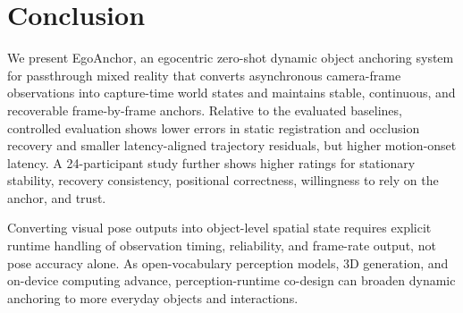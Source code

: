 \documentclass[review]{vgtc}
\begin{document}
\section{Conclusion}\label{sec:conclusion}

We present EgoAnchor, an egocentric zero-shot dynamic object anchoring system for passthrough mixed reality that converts asynchronous camera-frame observations into capture-time world states and maintains stable, continuous, and recoverable frame-by-frame anchors. Relative to the evaluated baselines, controlled evaluation shows lower errors in static registration and occlusion recovery and smaller latency-aligned trajectory residuals, but higher motion-onset latency. A 24-participant study further shows higher ratings for stationary stability, recovery consistency, positional correctness, willingness to rely on the anchor, and trust.

Converting visual pose outputs into object-level spatial state requires explicit runtime handling of observation timing, reliability, and frame-rate output, not pose accuracy alone. As open-vocabulary perception models, 3D generation, and on-device computing advance, perception-runtime co-design can broaden dynamic anchoring to more everyday objects and interactions.




\end{document}
